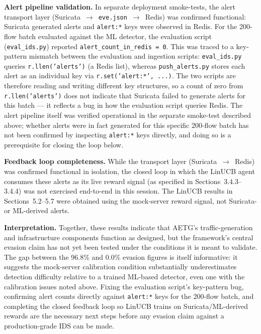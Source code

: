 \documentclass[review]{elsarticle}
\begin{document}
\textbf{Alert pipeline validation.} In separate deployment smoke-tests, the alert transport layer (Suricata~$\rightarrow$~\texttt{eve.json}~$\rightarrow$~Redis) was confirmed functional: Suricata generated alerts and \texttt{alert:*} keys were observed in Redis. For the 200-flow batch evaluated against the ML detector, the evaluation script (\texttt{eval\_ids.py}) reported \texttt{alert\_count\_in\_redis~=~0}. This was traced to a key-pattern mismatch between the evaluation and ingestion scripts: \texttt{eval\_ids.py} queries \texttt{r.llen('alerts')} (a Redis list), whereas \texttt{push\_alerts.py} stores each alert as an individual key via \texttt{r.set('alert:*', ...)}. The two scripts are therefore reading and writing different key structures, so a count of zero from \texttt{r.llen('alerts')} does not indicate that Suricata failed to generate alerts for this batch --- it reflects a bug in how the evaluation script queries Redis. The alert pipeline itself was verified operational in the separate smoke-test described above; whether alerts were in fact generated for this specific 200-flow batch has not been confirmed by inspecting \texttt{alert:*} keys directly, and doing so is a prerequisite for closing the loop below.

\textbf{Feedback loop completeness.} While the transport layer (Suricata~$\rightarrow$~Redis) was confirmed functional in isolation, the closed loop in which the LinUCB agent consumes these alerts as its live reward signal (as specified in Sections~3.4.3--3.4.4) was not exercised end-to-end in this session. The LinUCB results in Sections~5.2--5.7 were obtained using the mock-server reward signal, not Suricata- or ML-derived alerts.

\textbf{Interpretation.} Together, these results indicate that AETG's traffic-generation and infrastructure components function as designed, but the framework's central evasion claim has not yet been tested under the conditions it is meant to validate. The gap between the 96.8\% and 0.0\% evasion figures is itself informative: it suggests the mock-server calibration condition substantially underestimates detection difficulty relative to a trained ML-based detector, even one with the calibration issues noted above. Fixing the evaluation script's key-pattern bug, confirming alert counts directly against \texttt{alert:*} keys for the 200-flow batch, and completing the closed feedback loop so LinUCB trains on Suricata/ML-derived rewards are the necessary next steps before any evasion claim against a production-grade IDS can be made.
\end{document}

